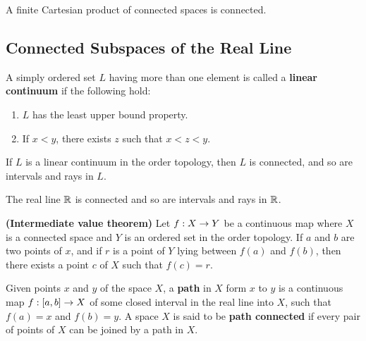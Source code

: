 \vs

\begin{thm}
A finite Cartesian product of connected spaces is connected.
\end{thm}


\subsection{Connected Subspaces of the Real Line}\nl
\setcounter{section}{24}
\setcounter{thm}{0}

\vs

\dfn A simply ordered set $L$ having more than one element is called a \textbf{linear continuum} if the following hold:
\begin{enumerate}
    \item $L$ has the least upper bound property.
    \item If $x < y$, there exists $z$ such that $x < z < y$.
\end{enumerate}

\vs

\begin{thm}
If $L$ is a linear continuum in the order topology, then $L$ is connected, and so are intervals and rays in $L$.
\end{thm}

\vs

\begin{cor}
The real line $\mathbb{R}$ is connected and so are intervals and rays in $\mathbb{R}$.
\end{cor}

\vs

\begin{thm}\textbf{(Intermediate value theorem)}
Let $f:X\rightarrow Y$ be a continuous map where $X$ is a connected space and $Y$ is an ordered set in the order topology. If $a$ and $b$ are two points of $x$, and if $r$ is a point of $Y$ lying between $f(a)$ and $f(b)$, then there exists a point $c$ of $X$ such that $f(c) = r$.
\end{thm}

\vs

\dfn Given points $x$ and $y$ of the space $X$, a \textbf{path} in $X$ form $x$ to $y$ is a continuous map $f: [a,b] \rightarrow X$ of some closed interval in the real line into $X$, such that $f(a) = x$ and $f(b) = y$. A space $X$ is said to be \textbf{path connected} if every pair of points of $X$ can be joined by a path in $X$.


